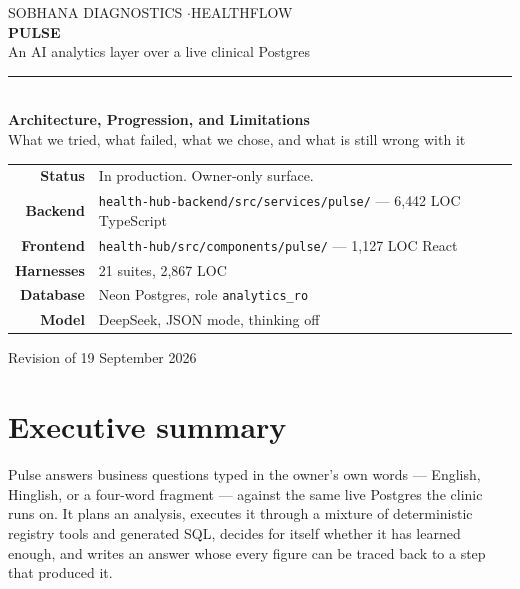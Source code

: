 \documentclass[11pt,a4paper]{report}
\newcommand{\file}[1]{\texttt{\small #1}}
\newcommand{\code}[1]{\texttt{\small #1}}
\begin{document}
\begin{titlepage}
\centering
\vspace*{2.2cm}
{\color{slate}\large SOBHANA DIAGNOSTICS \quad$\cdot$\quad HEALTHFLOW}\\[1.6cm]
{\color{navy}\Huge\bfseries PULSE}\\[0.5cm]
{\color{ink}\LARGE An AI analytics layer over a live clinical Postgres}\\[1.8cm]
\rule{0.55\textwidth}{0.6pt}\\[0.9cm]
{\large\bfseries Architecture, Progression, and Limitations}\\[0.4cm]
{\color{slate} What we tried, what failed, what we chose, and what is still wrong with it}\\[2.6cm]

\begin{minipage}{0.8\textwidth}\centering\small\color{slate}
\begin{tabular}{@{}r@{\quad}l@{}}
\textbf{Status} & In production. Owner-only surface.\\
\textbf{Backend} & \file{health-hub-backend/src/services/pulse/} --- 6{,}442 LOC TypeScript\\
\textbf{Frontend} & \file{health-hub/src/components/pulse/} --- 1{,}127 LOC React\\
\textbf{Harnesses} & 21 suites, 2{,}867 LOC\\
\textbf{Database} & Neon Postgres, role \code{analytics\_ro}\\
\textbf{Model} & DeepSeek, JSON mode, thinking off\\
\end{tabular}
\end{minipage}

\vfill
{\color{slate}\small Revision of 19 September 2026}
\end{titlepage}

\tableofcontents
\clearpage

\chapter*{Executive summary}

Pulse answers business questions typed in the owner's own words --- English, Hinglish, or a
four-word fragment --- against the same live Postgres the clinic runs on. It plans an analysis,
executes it through a mixture of deterministic registry tools and generated SQL, decides for
itself whether it has learned enough, and writes an answer whose every figure can be traced back
to a step that produced it.
\end{document}
